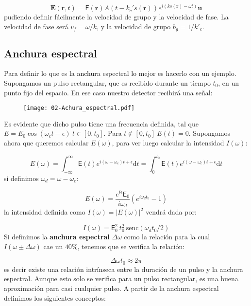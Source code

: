 \documentclass[12pt,a4paper]{book}
\numberwithin{equation}{section}
\numberwithin{figure}{section}
\newcommand{\D}{\mathrm{d}}
\newcommand{\1}{_{(1)}}
\newcommand{\2}{_{(2)}}
\newcommand{\un}{\mathbf{u}}
\newcommand{\rn}{\mathbf{r}}
\newcommand{\En}{\mathbf{E}}
\theoremstyle{definition}
\begin{document}
\begin{equation}
\En (\rn,t) = \mathsf{F} (\rn) A(t-k_c's(\rn)) e^{i (k s(\rn) - \omega t) } \un
\end{equation}
pudiendo definir fácilmente la velocidad de grupo y la velocidad de fase. La velocidad de fase será $v_f=\omega/k$, y la velocidad de grupo $b_g=1/k'_c$. \\

\subsection{Anchura espectral}

Para definir lo que es la anchura espectral lo mejor es hacerlo con un ejemplo. Supongamos un pulso rectangular, que es recibido durante un tiempo $t_0$, en un punto fijo del espacio. En ese caso nuestro detector recibirá una señal:

\begin{figure}[h!] \centering
 \texttt{[image: 02-Achura\_espectral.pdf]}
\end{figure}

Es evidente que dicho pulso tiene una frecuencia definida, tal que $E =E_0 \cos (\omega_c t - \epsilon) \ t \in [0,t_0]$. Para $t \notin [0,t_0] \ E(t)=0$. Supongamos ahora que queremos calcular $E(\omega)$, para ver luego calcular la intensidad $I(\omega)$:

\begin{equation}
E (\omega) = \int_{-\infty}^{\infty} \mathsf{E}(t) e^{i (\omega-\omega_c)t + \epsilon} \D t = \int_{0}^{t_0} \mathsf{E}(t) e^{i (\omega-\omega_c)t + \epsilon} \D t 
\end{equation}
si definimos $\omega_d = \omega-\omega_c$:

\begin{equation}
E(\omega) = \frac{e^{i \epsilon} \mathsf{E}_0 }{i \omega_d} (e^{i \omega_d t_0} -1)
\end{equation}
la intensidad definida como $I(\omega) = |E(\omega)|^2$ vendrá dada por:

\begin{equation}
I (\omega) = \mathsf{E}_0^2 \ t_0^2 \ \mathrm{senc} (\omega_d t_0 /2)
\end{equation}
Si definimos la \textbf{anchura espectral} $\Delta\omega$ como la relación para la cual $I(\omega\pm\Delta\omega)$ cae un $40\%$, tenemos que se verifica la relación:

\begin{equation}
\Delta \omega t_0 \approx 2 \pi
\end{equation}
es decir existe una relación intrínseca entre la duración de un pulso y la anchura espectral. Aunque esto solo se verifica para un pulso rectangular, es una buena aproximación para casi cualquier pulso. A partir de la anchura espectral definimos los siguientes conceptos:
\end{document}

